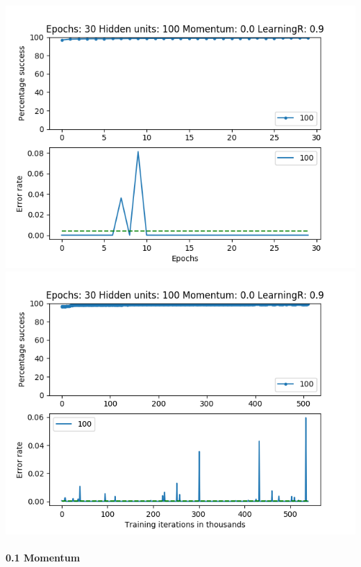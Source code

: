 \documentclass[11pt]{article}
\makeatletter
\def\maxwidth{\ifdim\Gin@nat@width>\linewidth\linewidth
    \else\Gin@nat@width\fi}
\let\Oldincludegraphics\includegraphics
\renewcommand{\includegraphics}[1]{\Oldincludegraphics[width=.8\maxwidth]{#1}}
\makeatother
\begin{document}
\includegraphics{Experiment1/E1_NN_Epoch_Momentum_0.0_30Epochs_100_LR_0.9_Hiddenunits.png}
\includegraphics{Experiment1/E1_NN_Training_Momentum_0.0_30Epochs_100_LR_0.9_Hiddenunits.png}

\hypertarget{momentum-1}{%
\paragraph{0.1 Momentum}\label{momentum-1}}
\end{document}
